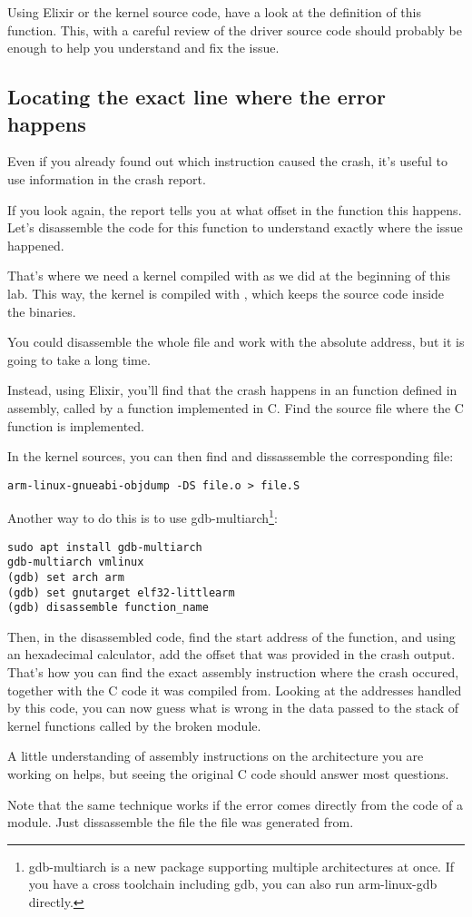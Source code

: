 Using Elixir or the kernel source code, have a look at the definition of this
function. This, with a careful review of the driver source code should
probably be enough to help you understand and fix the issue.

\subsection{Locating the exact line where the error happens}

Even if you already found out which instruction caused the crash, it's
useful to use information in the crash report.

If you look again, the report tells you at what offset in the function
this happens. Let's disassemble the code for this function to
understand exactly where the issue happened.

That's where we need a kernel compiled with 
as we did at the beginning of this lab. This way, the kernel is
compiled with , which keeps the source
code inside the binaries.

You could disassemble the whole  file and work with
the  absolute address, but it is going to take a long time.

Instead, using Elixir, you'll find that the crash happens in an function
defined in assembly, called by a function implemented in C. Find
the  source file where the C function is implemented.

In the kernel sources, you can then find
and dissassemble the corresponding  file:

\begin{verbatim}
arm-linux-gnueabi-objdump -DS file.o > file.S
\end{verbatim}

Another way to do this is to use {gdb-multiarch}\footnote{gdb-multiarch is a new package
supporting multiple architectures at once. If you have a cross
toolchain including gdb, you can also run arm-linux-gdb directly.}:

\begin{verbatim}
sudo apt install gdb-multiarch
gdb-multiarch vmlinux
(gdb) set arch arm
(gdb) set gnutarget elf32-littlearm
(gdb) disassemble function_name
\end{verbatim}

Then, in the disassembled code, find the start address of the
function, and using an hexadecimal calculator, add the offset that
was provided in the crash output. That's how you can find the
exact assembly instruction where the crash occured, together
with the C code it was compiled from. Looking at the addresses
handled by this code, you can now guess what is wrong in the
data passed to the stack of kernel functions called by the
broken module.

A little understanding of assembly instructions on the architecture
you are working on helps, but seeing the original C code should answer
most questions.

Note that the same technique works if the error comes directly from
the code of a module. Just dissassemble the  file
the  file was generated from.
